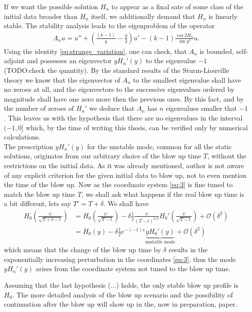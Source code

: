 If we want the possible solution $H_n$ to appear as a final sate of
some class of the initial data broader than $H_n$ itself, we
additionally demand that $H_n$ is linearly stable. The stability
analysis leads to the eigenproblem of the operator
\begin{align}
  \label{eq:8}
  A_n u=u''+\left(\frac{(k-1)}{y}-\frac{y}{2}\right)u'-(k-1)\frac{\cos2H_n}{\sin
    y^2}u.
\end{align}
Using the identity \eqref{eq:strange_variation}, one can check, that
$A_n$ is bounded, self-adjoint and possesses an eigenvector $yH_n'(y)$
to the eigenvalue $-1$ (TODO:check the quantity). By the standard
results of the Sturm-Liouville theory we know that the eigenvector of
$A_n$ to the smallest eigenvalue shall have no zeroes at all, and the
eigenvectors to the successive eigenvalues ordered by magnitude shall
have one zero more then the previous ones. By this fact, and by the
number of zeroes of $H_n'$ we deduce that $A_n$ has $n$ eigenvalues
smaller that $-1$. This leaves us with the hypothesis that there are
no eigenvalues in the interval $(-1,0]$ which, by the time of writing
this thesis, can be verified only by numerical calculations.\\
The prescription $yH_n'(y)$ for the unstable mode, common for all the
static solutions, originates from our arbitrary choice of the blow up
time $T$, without the restrictions on the initial data. As it was
already mentioned, author is not aware of any explicit criterion for
the given initial data to blow up, not to even mention the time of the
blow up. Now as the coordinate system \eqref{eq:3} is fine tuned to
match the blow up time $T$, we shall ask what happens if the real blow
up time is a bit different, lets say $T'=T+\delta$. We shall have
\begin{align}
  \label{eq:9}
  H_0\left(\frac{\psi}{\sqrt{T+\delta-t}}\right)
  &=H_0\left(\frac{\psi}{\sqrt{T-t}}\right)-\delta\frac{1}{2}\frac{\psi}{(T-t)^{3/2}}H_0'\left(\frac{\psi}{\sqrt{T-t}}\right)+\mathcal{O}(\delta^2)\\
  &=H_0(y)-\delta\frac{1}{2} e^{-(-1)s} \underbrace{yH_0'(y)}_{\text{unstable
    mode}}+\mathcal{O}(\delta^2)
\end{align}
which means that the change of the blow up time by $\delta$ results in
the exponentially increasing perturbation in the coordinates
\eqref{eq:3}, thus the mode $yH_n'(y)$ arises from the coordinate
system not tuned to the blow up time.

Assuming that the last hypothesis (...) holds, the only stable blow up
profile is $H_0$. The more detailed analysis of the blow up scenario
and the possibility of continuation after the blow up will show up in
the, now in preparation, paper.


